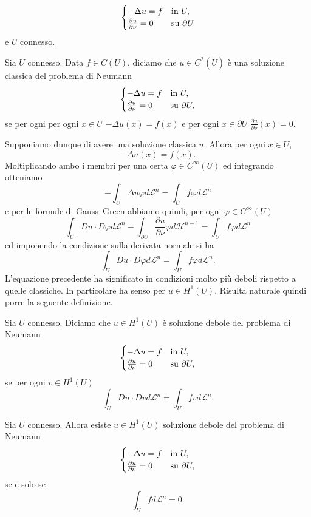 \begin{equation*}
	\begin{cases}
		-\Delta u = f & \textup{in } U,\\
		\frac{\partial u}{\partial \nu} = 0 & \textup{su } \partial U
	\end{cases} 
\end{equation*}
e $U$ connesso. 
\begin{definizione}
	Sia $U$ connesso. Data $f \in C(U)$, diciamo che $u \in C^2(\overline{U})$ è una soluzione classica del problema di Neumann
	\[ \begin{cases}
		-\Delta u = f & \textup{in } U,\\
		\frac{\partial u}{\partial \nu} = 0 & \textup{su } \partial U,
	\end{cases} \]
	se per ogni per ogni $x \in U$ $-\Delta u(x) = f(x)$ e per ogni $x \in \partial U$ $\frac{\partial u}{\partial \nu}(x) = 0$.
\end{definizione}
Supponiamo dunque di avere una soluzione classica $u$. Allora per ogni $x \in U$,
\[ -\Delta u(x) = f(x). \]
Moltiplicando ambo i membri per una certa $\varphi \in C^\infty(U)$ ed integrando otteniamo 
\[ -\int_U\Delta u \varphi d\mathcal{L}^n = \int_U f \varphi d\mathcal{L}^n \] 
e per le formule di Gauss--Green abbiamo quindi, per ogni $\varphi \in C^\infty(U)$
\[ \int_U Du \cdot D\varphi d\mathcal{L}^n - \int_{\partial U} \frac{\partial u}{\partial \nu} \varphi d\mathcal{H}^{n-1} = \int_U f \varphi d\mathcal{L}^n\]
ed imponendo la condizione sulla derivata normale si ha
\[ \int_U Du \cdot D\varphi d\mathcal{L}^n = \int_U f \varphi d\mathcal{L}^n.\]
L'equazione precedente ha significato in condizioni molto più deboli rispetto a quelle classiche. In particolare ha senso per $u \in H^1(U)$. Risulta naturale quindi porre la seguente definizione.
\begin{definizione}
	Sia $U$ connesso. Diciamo che $u \in H^1(U)$ è soluzione debole del problema di Neumann
	\[ \begin{cases}
		-\Delta u = f & \textup{in } U,\\
		\frac{\partial u}{\partial \nu} = 0 & \textup{su } \partial U,
	\end{cases} \]
	se per ogni $v \in H^1(U)$
	\[ \int_U Du \cdot Dv d\mathcal{L}^n = \int_U fv d\mathcal{L}^n. \]
\end{definizione}
\begin{teorema}
	Sia $U$ connesso. Allora esiste $u \in H^1(U)$ soluzione debole del problema di Neumann
	\[ \begin{cases}
		-\Delta u = f & \textup{in } U,\\
		\frac{\partial u}{\partial \nu} = 0 & \textup{su } \partial U,
	\end{cases} \]
	se e solo se 
	\[ \int_U f d\mathcal{L}^n = 0. \]
\end{teorema}
